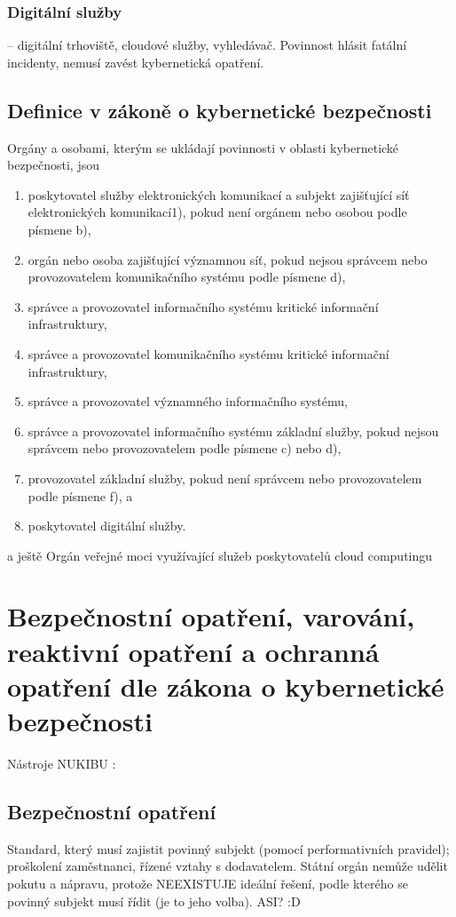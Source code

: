 \subsubsection*{Digitální služby} -- digitální trhoviště, cloudové služby, vyhledávač. Povinnost hlásit fatální incidenty, nemusí zavést kybernetická opatření.

\subsection{Definice v zákoně o kybernetické bezpečnosti}

Orgány a osobami, kterým se ukládají povinnosti v oblasti kybernetické bezpečnosti, jsou

\begin{enumerate}[label=\alph*)]
\item poskytovatel služby elektronických komunikací a subjekt zajišťující síť elektronických komunikací1), pokud není orgánem nebo osobou podle písmene b),
\item orgán nebo osoba zajišťující významnou síť, pokud nejsou správcem nebo provozovatelem komunikačního systému podle písmene d),
\item správce a provozovatel informačního systému kritické informační infrastruktury,
\item správce a provozovatel komunikačního systému kritické informační infrastruktury,
\item správce a provozovatel významného informačního systému,
\item správce a provozovatel informačního systému základní služby, pokud nejsou správcem nebo provozovatelem podle písmene c) nebo d),
\item provozovatel základní služby, pokud není správcem nebo provozovatelem podle písmene f), a
\item poskytovatel digitální služby.
\end{enumerate}
a ještě
Orgán veřejné moci využívající služeb poskytovatelů cloud computingu

\clearpage
\section{Bezpečnostní opatření, varování, reaktivní opatření a ochranná opatření dle zákona o kybernetické bezpečnosti}
Nástroje NUKIBU :
\subsection*{Bezpečnostní opatření}
Standard, který musí zajistit povinný subjekt (pomocí performativních pravidel); proškolení zaměstnanci, řízené vztahy s dodavatelem. Státní orgán nemůže udělit pokutu a nápravu, protože NEEXISTUJE ideální řešení, podle kterého se povinný subjekt musí řídit (je to jeho volba). ASI? :D

